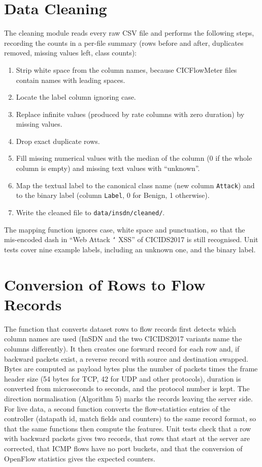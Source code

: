 \section{Data Cleaning}
The cleaning module reads every raw CSV file and performs the following steps, recording the counts in a per-file summary (rows before and after, duplicates removed, missing values left, class counts):
\begin{enumerate}
	\item Strip white space from the column names, because CICFlowMeter files contain names with leading spaces.
	\item Locate the label column ignoring case.
	\item Replace infinite values (produced by rate columns with zero duration) by missing values.
	\item Drop exact duplicate rows.
	\item Fill missing numerical values with the median of the column (0 if the whole column is empty) and missing text values with ``unknown''.
	\item Map the textual label to the canonical class name (new column \texttt{Attack}) and to the binary label (column \texttt{Label}, 0 for Benign, 1 otherwise).
	\item Write the cleaned file to \texttt{data/insdn/cleaned/}.
\end{enumerate}
The mapping function ignores case, white space and punctuation, so that the mis-encoded dash in ``Web Attack \texttt{\char`\?} XSS'' of CICIDS2017 is still recognised. Unit tests cover nine example labels, including an unknown one, and the binary label.

\section{Conversion of Rows to Flow Records}
The function that converts dataset rows to flow records first detects which column names are used (InSDN and the two CICIDS2017 variants name the columns differently). It then creates one forward record for each row and, if backward packets exist, a reverse record with source and destination swapped. Bytes are computed as payload bytes plus the number of packets times the frame header size (54 bytes for TCP, 42 for UDP and other protocols), duration is converted from microseconds to seconds, and the protocol number is kept. The direction normalisation (Algorithm 5) marks the records leaving the server side. For live data, a second function converts the flow-statistics entries of the controller (datapath id, match fields and counters) to the same record format, so that the same functions then compute the features. Unit tests check that a row with backward packets gives two records, that rows that start at the server are corrected, that ICMP flows have no port buckets, and that the conversion of OpenFlow statistics gives the expected counters.

